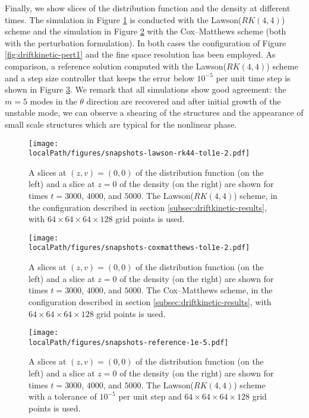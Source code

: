 Finally, we show slices of the distribution function and the density at different times. The simulation in Figure \ref{fig:snapshots-lrk44} is conducted with the Lawson($RK(4,4)$) scheme and the simulation in Figure \ref{fig:snapshots-cm} with the Cox--Matthews scheme (both 
with the perturbation formulation). In both cases the configuration of Figure \ref{fig:driftkinetic-pert1} and the fine space resolution has been employed. As comparison, a reference solution computed with the Lawson($RK(4,4)$) scheme and a step size controller that keeps the error below $10^{-5}$ per unit time step is shown in Figure \ref{fig:snapshots-ref}. We remark that all simulations show good agreement: the $m=5$ modes in the $\theta$ 
direction are recovered and after initial growth of the unstable mode,
 we can observe a shearing of the structures and the appearance of small scale structures which are typical for the nonlinear phase. 

\begin{figure}[h]
	\centering
    \texttt{[image: \\localPath/figures/snapshots-lawson-rk44-tol1e-2.pdf]}
    \caption{A slices at $(z,v)=(0,0)$ of the distribution function  (on the left) and a slice at $z=0$ of the density (on the right) are shown for times $t=3000$, $4000$, and $5000$. The Lawson($RK(4,4)$) scheme, in the configuration described in section \ref{subsec:driftkinetic-results}, with $64\times64\times64\times128$ grid points is used. \label{fig:snapshots-lrk44}}
\end{figure}


\begin{figure}[h]
	\centering
    \texttt{[image: \\localPath/figures/snapshots-coxmatthews-tol1e-2.pdf]}
    \caption{A slices at $(z,v)=(0,0)$ of the distribution function  (on the left) and a slice at $z=0$ of the density (on the right) are shown for times $t=3000$, $4000$, and $5000$. The Cox--Matthews scheme, in the configuration described in section \ref{subsec:driftkinetic-results}, with $64\times64\times64\times128$ grid points is used. \label{fig:snapshots-cm}}
\end{figure}


\begin{figure}[h]
	\centering
    \texttt{[image: \\localPath/figures/snapshots-reference-1e-5.pdf]}
    \caption{A slices at $(z,v)=(0,0)$ of the distribution function  (on the left) and a slice at $z=0$ of the density (on the right) are shown for times $t=3000$, $4000$, and $5000$. The Lawson($RK(4,4)$) scheme with a tolerance of $10^{-5}$ per unit step and $64\times64\times64\times128$ grid points is used. \label{fig:snapshots-ref}}
\end{figure}




